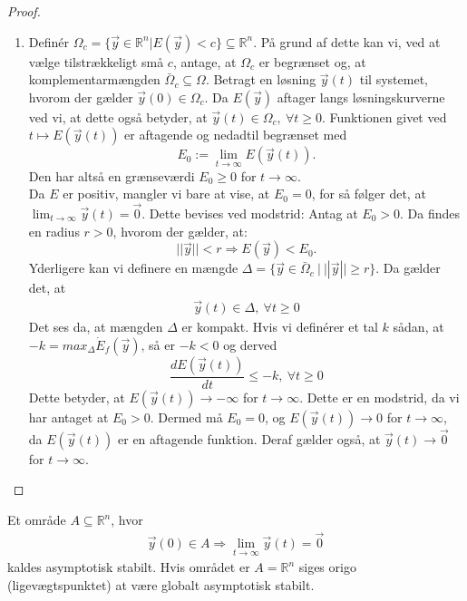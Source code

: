 \begin{proof}
\begin{enumerate}
  \item  Definér $\Omega_c = \{\vec{y}\in \mathbb{R}^n | E(\vec{y}) < c\} \subseteq \mathbb{R}^n$. På grund af dette kan vi, ved at vælge tilstrækkeligt små $c$, antage, at  $\Omega_c$ er begrænset og, at komplementarmængden $\bar{\Omega}_c \subseteq \Omega.$ \hfill \break
  Betragt en løsning $\vec{y}(t)$ til systemet, hvorom der gælder $\vec{y}(0) \in \Omega_c$. Da $E(\vec{y})$ aftager langs løsningskurverne ved vi, at dette også betyder, at $\vec{y}(t) \in \Omega_c, \ \forall t\geq 0$. Funktionen givet ved $t \mapsto E(\vec{y}(t))$ er aftagende og nedadtil begrænset med $$E_0 := \lim_{t\to \infty} E(\vec{y}(t)) .$$ Den har altså en grænseværdi $E_0 \geq 0$ for $t \to \infty$. \\
  \hfill \break
  Da $E$ er positiv, mangler vi bare at vise, at $E_0=0$, for så følger det, at $ \lim_{t \to \infty} \vec{y}(t)=\vec{0}$. 
  Dette bevises ved modstrid: Antag at $E_0>0$. Da findes en radius $r>0$, hvorom der gælder, at:
  $$||\vec{y}||<r \Rightarrow E(\vec{y})< E_0.$$ Yderligere kan vi definere en mængde $\Delta=\{\vec{y}\in \bar{\Omega}_c \ | \ ||\vec{y}||\geq r\}$. Da gælder det, at
  \begin{align*}
    \vec{y}(t) \in \Delta, \ \forall t \geq 0
  \end{align*}
  Det ses da, at mængden $\Delta$ er kompakt. Hvis vi definérer et tal $k$ sådan, at $-k=max_{\Delta}\dot{E}_f(\vec{y})$, så er $-k<0$ og derved
  \begin{equation}\label{eq48}
  \frac{dE(\vec{y}(t))}{dt}\leq-k, \ \forall t\geq 0
  \end{equation}
  Dette betyder, at $E(\vec{y}(t)) \to -\infty$ for $t\to \infty$. Dette er en modstrid, da vi har antaget at $E_0>0$. Dermed må $E_0=0$, og $E(\vec{y}(t)) \to 0$ for $t \to \infty$, da $E(\vec{y}(t))$ er en aftagende funktion. Deraf gælder også, at $\vec{y}(t) \to \vec{0}$ for $t \to \infty$.
\end{enumerate}
\end{proof}


\begin{definition}
Et område $A \subseteq \mathbb{R}^n$, hvor 
\begin{align*}
    \vec{y}(0) \in A \Rightarrow \lim_{t\to \infty} \vec{y}(t)=\vec{0}
\end{align*}
kaldes asymptotisk stabilt. Hvis området er $A=\mathbb{R}^n$ siges origo (ligevægtspunktet) at være globalt asymptotisk stabilt.
\end{definition}

